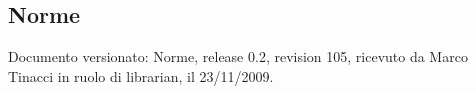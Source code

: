 \subsection{Norme}
Documento versionato: Norme, release 0.2, revision 105, ricevuto da
Marco Tinacci in ruolo di librarian, il 23/11/2009.